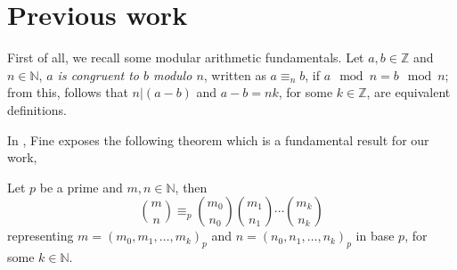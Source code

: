 

\section{Previous work}
\label{sec:previous:work}

First of all, we recall some modular arithmetic fundamentals. Let
$a,b\in\mathbb{Z}$ and $n\in\mathbb{N}$, \textit{$a$ is congruent to $b$ modulo
$n$}, written as $a \equiv_{n} b$, if $a \mod n = b \mod n$; from this, follows
that $n \left| (a-b)\right.$ and $a - b = nk$, for some $k\in\mathbb{Z}$, are
equivalent definitions.


In \cite{fine:1947}, Fine exposes the following theorem which is a fundamental
result for our work, 

\begin{theorem}[Lucas] Let $p$ be a prime and $m,n\in\mathbb{N}$, then
    \begin{displaymath}
        {{m}\choose{n}} \equiv_{p} 
            {{m_{0}}\choose{n_{0}}} 
            {{m_{1}}\choose{n_{1}}} 
            \cdots 
            {{m_{k}}\choose{n_{k}}} 
    \end{displaymath}
    representing $m=\left(m_{0},m_{1},\ldots,m_{k}\right)_{p}$ and
    $n=\left(n_{0},n_{1},\ldots,n_{k}\right)_{p}$ in base $p$, for some $k\in\mathbb{N}$.
    \iffalse
    So both $m_{j}$ and $n_{j}$ are in $\lbrace 0,\ldots, p-1 \rbrace$, for
    $j\in\lbrace 0,\ldots,k\rbrace$.
    \fi
    \label{thm:lucas:theorem}
\end{theorem}

